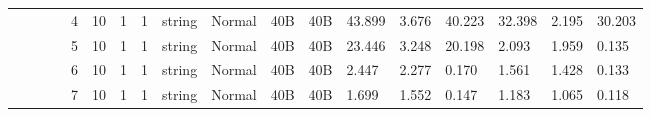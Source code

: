 \begin{landscape}
\begin{table}[]
{\begin{tabular}{@{}ccccllllllllllllll@{}}
                                                                                   &                              &                                &                                                                                                          & 4                                                     & 10                                       & 1                                          & 1                                 & string                           & Normal                             & 40B                                           & 40B                                             & 43.899                  & 3.676    & 40.223                       & 32.398                  & 2.195    & 30.203                       \\
                                                                                   &                              &                                &                                                                                                          & 5                                                     & 10                                       & 1                                          & 1                                 & string                           & Normal                             & 40B                                           & 40B                                             & 23.446                  & 3.248    & 20.198                       & 2.093                   & 1.959    & 0.135                        \\
                                                                                   &                              &                                &                                                                                                          & 6                                                     & 10                                       & 1                                          & 1                                 & string                           & Normal                             & 40B                                           & 40B                                             & 2.447                   & 2.277    & 0.170                        & 1.561                   & 1.428    & 0.133                        \\
                                                                                   &                              &                                &                                                                                                          & 7                                                     & 10                                       & 1                                          & 1                                 & string                           & Normal                             & 40B                                           & 40B                                             & 1.699                   & 1.552    & 0.147                        & 1.183                   & 1.065    & 0.118                        \\

\end{tabular}}
\end{table}
\end{landscape}
